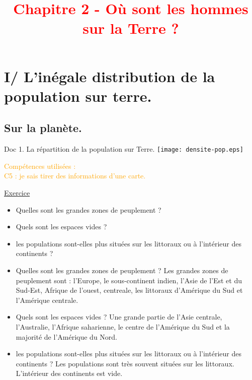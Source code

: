 \documentclass{beamer}
\title{{\textcolor{red}{Chapitre 2 - Où sont les hommes sur la Terre ?}}}
\begin{document}
 
\begin{frame}
\titlepage %
\end{frame}

\begin{frame}
\tableofcontents
\end{frame}

\section{I/ L'inégale distribution de la population sur terre.}
\subsection{Sur la planète.}
\begin{frame}
\begin{beamerboxesrounded}[scheme=blocimage]{Doc 1. La répartition de la population sur Terre.} 
\texttt{[image: densite-pop.eps]}
\end{beamerboxesrounded}
\end{frame}

\begin{frame}
\begin{flushright}
{\tiny \textcolor{orange}{Compétences utilisées : \\
C5 : je sais tirer des informations d'une carte.\\}}
\end{flushright}
\underline{Exercice}
\begin{itemize}
\item Quelles sont les grandes zones de peuplement ?
\item Quels sont les espaces vides ?
\item les populations sont-elles plus situées sur les littoraux ou à l'intérieur des continents ?
\end{itemize}
\end{frame}

\begin{frame}
\begin{itemize}
\item Quelles sont les grandes zones de peuplement ?
\textcolor{black!70!green}{Les grandes zones de peuplement sont : l'Europe, le sous-continent indien, l'Asie de l'Est et du Sud-Est, Afrique de l'ouest, centreale, les littoraux d'Amérique du Sud et l'Amérique centrale.}
\vfill
\pause \item Quels sont les espaces vides ?
\pause \textcolor{black!70!green}{Une grande partie de l'Asie centrale, l'Australie, l'Afrique saharienne, le centre de l'Amérique du Sud et la majorité de l'Amérique du Nord.}
\vfill
\pause
\item les populations sont-elles plus situées sur les littoraux ou à l'intérieur des continents ?
\pause \textcolor{black!70!green}{Les populations sont très souvent situées sur les littoraux. L'intérieur des continents est vide.}
\end{itemize}
\end{frame}
\end{document}
